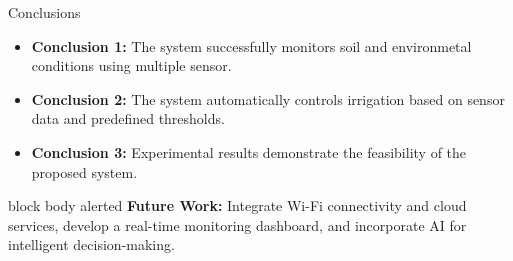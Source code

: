 \documentclass[aspectratio=169, 10pt]{beamer}
\begin{document}
\begin{frame}{Conclusions}
  \footnotesize %
  \begin{itemize}
    \setlength{\itemsep}{0.5em}
    \item \textbf{Conclusion 1:} The system successfully monitors soil and environmetal conditions using
          multiple sensor.
    \item \textbf{Conclusion 2:} The system automatically controls irrigation based
          on sensor data and predefined thresholds.
    \item \textbf{Conclusion 3:} Experimental results demonstrate the feasibility
          of the proposed system.
  \end{itemize}

  \vspace{1em}
  \begin{beamercolorbox}[wd=\textwidth, rounded=true, sep=7pt]{block body alerted}
    \textbf{\textcolor{MLIOTblue}{Future Work:}}
    \textcolor{MLIOTink}{\footnotesize Integrate Wi-Fi connectivity and cloud services, develop
    a real-time monitoring dashboard, and incorporate AI for intelligent decision-making.}
  \end{beamercolorbox}
\end{frame}
\end{document}
